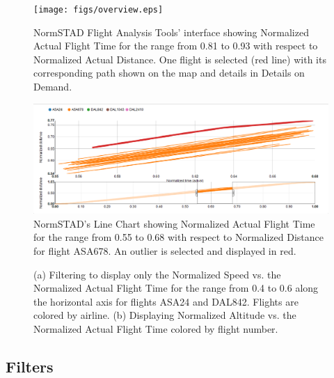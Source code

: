 \documentclass{sig-alternate}
\begin{document}
\begin{figure}
\centering
\texttt{[image: figs/overview.eps]}
\caption{
NormSTAD Flight Analysis Tools' interface showing Normalized Actual Flight Time
for the range from 0.81 to 0.93 with 
respect to Normalized Actual Distance. One flight is selected (red line) with its 
corresponding path shown on the map and details in Details on Demand.
}
\label{overview}
\vspace{-10mm}
\end{figure}
\begin{figure}
\centering
\includegraphics[width=\textwidth]{figs/outlier.eps}
\caption{NormSTAD's Line Chart showing Normalized Actual Flight Time
for the range from 0.55 to 0.68 with respect to Normalized Distance for 
flight ASA678. An outlier is selected and displayed in red.}
\label{outlier}
\end{figure}


\begin{figure}
\centering
{}\hfill
{}
\caption{
(a) Filtering to display only the Normalized Speed vs. the Normalized Actual Flight Time for the range from 0.4 to 0.6 along the horizontal axis for flights ASA24 and DAL842. Flights are colored by airline.
(b) Displaying Normalized Altitude vs. the Normalized Actual Flight Time colored by flight number.}
\label{lines}
\end{figure}
 
\subsection{Filters}
\label{subsec-filters}
\end{document}
